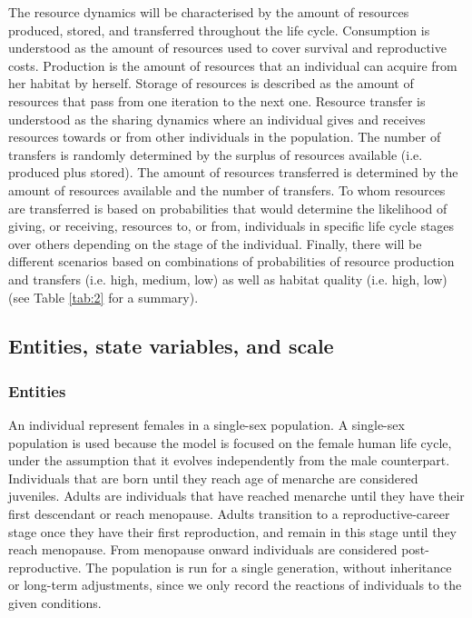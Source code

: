 \documentclass{article}
\begin{document}
The resource dynamics will be characterised by the amount of resources produced, stored, and transferred throughout the life cycle. Consumption is understood as the amount of resources used to cover survival and reproductive costs. Production is the amount of resources that an individual can acquire from her habitat by herself. Storage of resources is described as the amount of resources that pass from one iteration to the next one. Resource transfer is understood as the sharing dynamics where an individual gives and receives resources towards or from other individuals in the population. The number of transfers is randomly determined by the surplus of resources available (i.e. produced plus stored). The amount of resources transferred is determined by the amount of resources available and the number of transfers. To whom resources are transferred is based on probabilities that would determine the likelihood of giving, or receiving, resources to, or from, individuals in specific life cycle stages over others depending on the stage of the individual. Finally, there will be different scenarios based on combinations of probabilities of resource production and transfers (i.e. high, medium, low) as well as habitat quality (i.e. high, low) (see Table \ref{tab:2} for a summary).

\subsection{Entities, state variables, and scale}

\subsubsection{Entities}

An individual represent females in a single-sex population. A single-sex population is used because the model is focused on the female human life cycle, under the assumption that it evolves independently from the male counterpart. Individuals that are born until they reach age of menarche are considered juveniles. Adults are individuals that have reached menarche until they have their first descendant or reach menopause. Adults transition to a reproductive-career stage once they have their first reproduction, and remain in this stage until they reach menopause. From menopause onward individuals are considered post-reproductive. The population is run for a single generation, without inheritance or long-term adjustments, since we only record the reactions of individuals to the given conditions.
\end{document}

